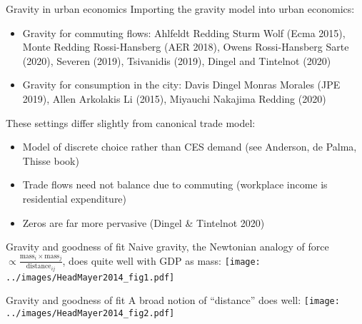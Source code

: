 \documentclass[10pt,notes=hide]{beamer}
\begin{document}
\begin{frame}{Gravity in urban economics}
Importing the gravity model into urban economics:
\begin{itemize}
	\item Gravity for commuting flows: 
	Ahlfeldt Redding Sturm Wolf (Ecma 2015), Monte Redding Rossi-Hansberg (AER 2018), Owens Rossi-Hansberg Sarte (2020), Severen (2019), Tsivanidis (2019), Dingel and Tintelnot (2020)
	\item Gravity for consumption in the city:
	Davis Dingel Monras Morales (JPE 2019), Allen Arkolakis Li (2015), Miyauchi Nakajima Redding (2020)
\end{itemize}
These settings differ slightly from canonical trade model: 
\begin{itemize}
	\item Model of discrete choice rather than CES demand (see Anderson, de Palma, Thisse book)
	\item Trade flows need not balance due to commuting (workplace income is residential expenditure)
	\item Zeros are far more pervasive (Dingel \& Tintelnot 2020)
\end{itemize}
\end{frame}
\begin{frame}{Gravity and goodness of fit}
Naive gravity,
the Newtonian analogy of force $\propto \frac{\text{mass}_i \times \text{mass}_j}{\text{distance}_{ij}}$,
does quite well with GDP as mass:
\texttt{[image: ../images/HeadMayer2014\_fig1.pdf]}
\end{frame}
\begin{frame}{Gravity and goodness of fit}
A broad notion of ``distance'' does well:
\texttt{[image: ../images/HeadMayer2014\_fig2.pdf]}
\end{frame}
\end{document}
